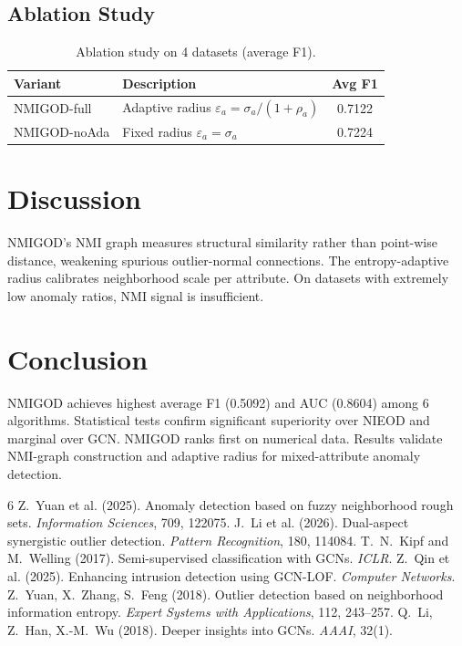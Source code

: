 \documentclass[11pt,a4paper,twocolumn]{article}
\begin{document}
\subsection{Ablation Study}
\begin{table}[H]
\centering
\caption{Ablation study on 4 datasets (average F1).}
\label{tab:ablation}
\begin{tabular}{llc}
\toprule
Variant & Description & Avg F1 \\
\midrule
NMIGOD-full & Adaptive radius $\varepsilon_a = \sigma_a/(1+\rho_a)$ & 0.7122 \\
NMIGOD-noAda & Fixed radius $\varepsilon_a = \sigma_a$ & 0.7224 \\
\bottomrule
\end{tabular}
\end{table}

\section{Discussion}
NMIGOD's NMI graph measures structural similarity rather than point-wise distance, weakening spurious outlier-normal connections. The entropy-adaptive radius calibrates neighborhood scale per attribute. On datasets with extremely low anomaly ratios, NMI signal is insufficient.

\section{Conclusion}
NMIGOD achieves highest average F1 (0.5092) and AUC (0.8604) among 6 algorithms. Statistical tests confirm significant superiority over NIEOD and marginal over GCN. NMIGOD ranks first on numerical data. Results validate NMI-graph construction and adaptive radius for mixed-attribute anomaly detection.

\begin{thebibliography}{6}
 Z.~Yuan et al. (2025). Anomaly detection based on fuzzy neighborhood rough sets. \textit{Information Sciences}, 709, 122075.
 J.~Li et al. (2026). Dual-aspect synergistic outlier detection. \textit{Pattern Recognition}, 180, 114084.
 T.~N.~Kipf and M.~Welling (2017). Semi-supervised classification with GCNs. \textit{ICLR}.
 Z.~Qin et al. (2025). Enhancing intrusion detection using GCN-LOF. \textit{Computer Networks}.
 Z.~Yuan, X.~Zhang, S.~Feng (2018). Outlier detection based on neighborhood information entropy. \textit{Expert Systems with Applications}, 112, 243--257.
 Q.~Li, Z.~Han, X.-M.~Wu (2018). Deeper insights into GCNs. \textit{AAAI}, 32(1).
\end{thebibliography}
\end{document}
